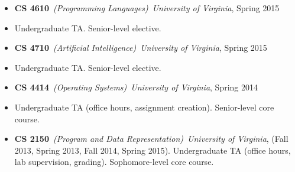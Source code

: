 \documentclass[10pt]{article}
\newenvironment{class}[4]{\setlength{\parskip}{0pt}%
	\begin{itemize}[label={},leftmargin=0cm,labelindent=0pt,nolistsep]%
		\item\textbf{#1}~\emph{({#2})}~\hfill\emph{#3}, #4}{\end{itemize}\medskip}
\begin{document}
\begin{class}{CS 4610}{Programming Languages}{University of Virginia}{Spring 2015}
	\item Undergraduate TA. Senior-level elective.
\end{class}

\begin{class}{CS 4710}{Artificial Intelligence}{University of Virginia}{Spring 2015}
	\item Undergraduate TA. Senior-level elective.
\end{class}

\begin{class}{CS 4414}{Operating Systems}{University of Virginia}{Spring 2014}
	\item Undergraduate TA (office hours, assignment creation). Senior-level core course.
\end{class}

\begin{class}{CS 2150}{Program and Data Representation}{University of Virginia}{(Fall 2013, Spring
		2013, Fall 2014, Spring 2015). Undergraduate TA (office hours, lab supervision, grading). Sophomore-level core course.}
\end{class}
\end{document}
